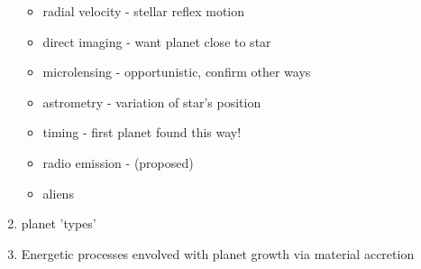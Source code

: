 \documentclass[12pt]{article}
\begin{document}
\begin{enumerate}
\begin{itemize}
    \item radial velocity - stellar reflex motion
    \item direct imaging - want planet close to star
    \item microlensing - opportunistic, confirm other ways
    \item astrometry - variation of star's position
    \item timing - first planet found this way!
    \item radio emission - (proposed)
    \item aliens
  \end{itemize}
\item planet 'types'
\item Energetic processes envolved with planet growth via material
accretion

\end{enumerate}
\end{document}

